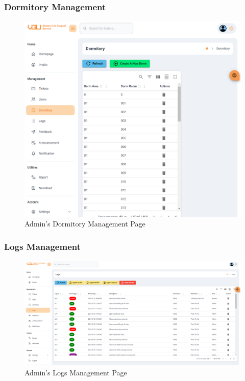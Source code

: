 	\subsubsection{Dormitory Management}
	\begin{figure}[H]
		\centering
		\includegraphics[width=1\linewidth]{graphics/gui/admin/dorm-mng}
		\caption{Admin's Dormitory Management Page}
		\label{fig:gui-ad-dorm-mng}
	\end{figure}
	
	
	\subsubsection{Logs Management}
	\begin{figure}[H]
		\centering
		\includegraphics[width=1\linewidth]{graphics/gui/admin/logs-mng}
		\caption{Admin's Logs Management Page}
		\label{fig:gui-ad-logs-mng}
	\end{figure}
	
